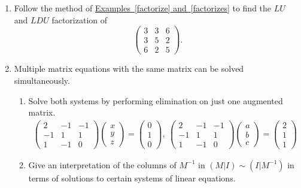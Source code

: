 \begin{enumerate}

\item Follow the method of  \hyperlink{elldeeeww}{Examples~\ref{factorize} and~\ref{factorizes}} to find the $LU$ and $LDU$ factorization of 
\[
\begin{pmatrix}
3	&3 	&6 \\ %
3 	&5 	&2 \\ %
6	&2	&5 %
\end{pmatrix} .
\]




\item 
Multiple matrix equations with the same matrix can be solved simultaneously. 
\begin{enumerate}
\item Solve both systems by performing elimination on just one augmented matrix.
\begin{align*}
\begin{pmatrix}
2	&-1 	&-1 \\ %
-1 	&1 	&1 \\ %
1	&-1	&0  %
\end{pmatrix} 
\begin{pmatrix}
 x \\ 
y \\
z 
\end{pmatrix} 
=
\begin{pmatrix}
0\\ 
1  \\
0  
\end{pmatrix} 
,~
\begin{pmatrix}
2	&-1 	&-1 \\ %
-1 	&1 	&1 \\ %
1	&-1	&0 %
\end{pmatrix} 
\begin{pmatrix}
 a \\ 
b \\
c 
\end{pmatrix} 
=
\begin{pmatrix}
2\\ 
1  \\
1 
\end{pmatrix} 
\end{align*}
\item Give an interpretation of the columns of $M^{-1}$ in $(M|I)\sim (I|M^{-1})$ in terms of solutions to certain systems of linear equations.
\end{enumerate}


\end{enumerate}
